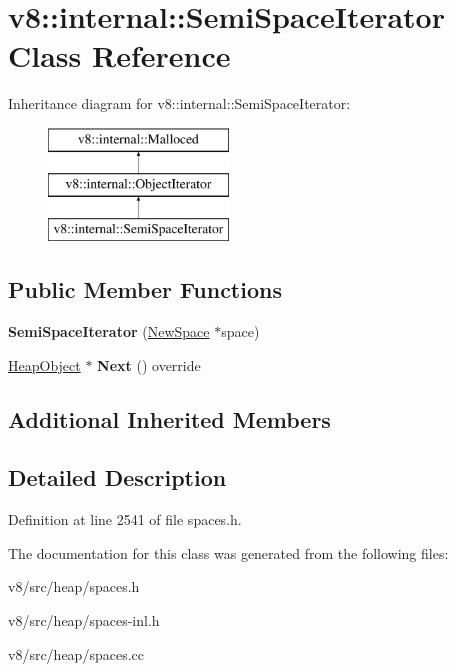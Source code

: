 \hypertarget{classv8_1_1internal_1_1SemiSpaceIterator}{}\section{v8\+:\+:internal\+:\+:Semi\+Space\+Iterator Class Reference}
\label{classv8_1_1internal_1_1SemiSpaceIterator}
Inheritance diagram for v8\+:\+:internal\+:\+:Semi\+Space\+Iterator\+:\begin{figure}[H]
\begin{center}
\leavevmode
\includegraphics[height=3.000000cm]{classv8_1_1internal_1_1SemiSpaceIterator}
\end{center}
\end{figure}
\subsection*{Public Member Functions}
\begin{DoxyCompactItemize}
\item 
\mbox{\label{classv8_1_1internal_1_1SemiSpaceIterator_ac5e7b5fd619d66ab4704cb5963b68d2c}} 
{\bfseries Semi\+Space\+Iterator} (\mbox{\hyperlink{classv8_1_1internal_1_1NewSpace}{New\+Space}} $\ast$space)
\item 
\mbox{\label{classv8_1_1internal_1_1SemiSpaceIterator_adbca0b2b577e9271daf25b962bf7f4dd}} 
\mbox{\hyperlink{classv8_1_1internal_1_1HeapObject}{Heap\+Object}} $\ast$ {\bfseries Next} () override
\end{DoxyCompactItemize}
\subsection*{Additional Inherited Members}


\subsection{Detailed Description}


Definition at line 2541 of file spaces.\+h.



The documentation for this class was generated from the following files\+:\begin{DoxyCompactItemize}
\item 
v8/src/heap/spaces.\+h\item 
v8/src/heap/spaces-\/inl.\+h\item 
v8/src/heap/spaces.\+cc\end{DoxyCompactItemize}
